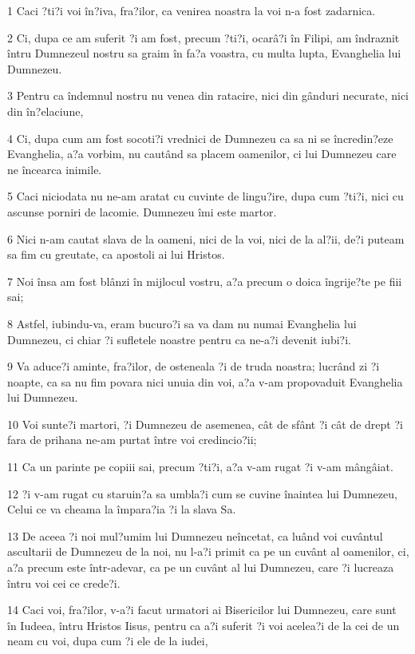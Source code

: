 \par 1 Caci ?ti?i voi în?iva, fra?ilor, ca venirea noastra la voi n-a fost zadarnica.
\par 2 Ci, dupa ce am suferit ?i am fost, precum ?ti?i, ocarâ?i în Filipi, am îndraznit întru Dumnezeul nostru sa graim în fa?a voastra, cu multa lupta, Evanghelia lui Dumnezeu.
\par 3 Pentru ca îndemnul nostru nu venea din ratacire, nici din gânduri necurate, nici din în?elaciune,
\par 4 Ci, dupa cum am fost socoti?i vrednici de Dumnezeu ca sa ni se încredin?eze Evanghelia, a?a vorbim, nu cautând sa placem oamenilor, ci lui Dumnezeu care ne încearca inimile.
\par 5 Caci niciodata nu ne-am aratat cu cuvinte de lingu?ire, dupa cum ?ti?i, nici cu ascunse porniri de lacomie. Dumnezeu îmi este martor.
\par 6 Nici n-am cautat slava de la oameni, nici de la voi, nici de la al?ii, de?i puteam sa fim cu greutate, ca apostoli ai lui Hristos.
\par 7 Noi însa am fost blânzi în mijlocul vostru, a?a precum o doica îngrije?te pe fiii sai;
\par 8 Astfel, iubindu-va, eram bucuro?i sa va dam nu numai Evanghelia lui Dumnezeu, ci chiar ?i sufletele noastre pentru ca ne-a?i devenit iubi?i.
\par 9 Va aduce?i aminte, fra?ilor, de osteneala ?i de truda noastra; lucrând zi ?i noapte, ca sa nu fim povara nici unuia din voi, a?a v-am propovaduit Evanghelia lui Dumnezeu.
\par 10 Voi sunte?i martori, ?i Dumnezeu de asemenea, cât de sfânt ?i cât de drept ?i fara de prihana ne-am purtat între voi credincio?ii;
\par 11 Ca un parinte pe copiii sai, precum ?ti?i, a?a v-am rugat ?i v-am mângâiat.
\par 12 ?i v-am rugat cu staruin?a sa umbla?i cum se cuvine înaintea lui Dumnezeu, Celui ce va cheama la împara?ia ?i la slava Sa.
\par 13 De aceea ?i noi mul?umim lui Dumnezeu neîncetat, ca luând voi cuvântul ascultarii de Dumnezeu de la noi, nu l-a?i primit ca pe un cuvânt al oamenilor, ci, a?a precum este într-adevar, ca pe un cuvânt al lui Dumnezeu, care ?i lucreaza întru voi cei ce crede?i.
\par 14 Caci voi, fra?ilor, v-a?i facut urmatori ai Bisericilor lui Dumnezeu, care sunt în Iudeea, întru Hristos Iisus, pentru ca a?i suferit ?i voi acelea?i de la cei de un neam cu voi, dupa cum ?i ele de la iudei,
